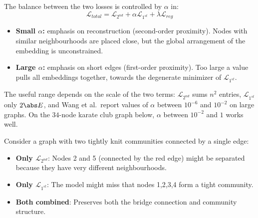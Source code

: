 \begin{notechapter}
The balance between the two losses is controlled by $\alpha$ in:
\[
\mathcal{L}_{total} = \mathcal{L}_{2^{nd}} + \alpha \mathcal{L}_{1^{st}} + \lambda \mathcal{L}_{reg}
\]

\begin{itemize}
    \item \textbf{Small $\alpha$:} emphasis on reconstruction (second-order proximity). Nodes with similar neighbourhoods are placed close, but the global arrangement of the embedding is unconstrained.
    \item \textbf{Large $\alpha$:} emphasis on short edges (first-order proximity). Too large a value pulls all embeddings together, towards the degenerate minimizer of $\mathcal L_{1^{st}}$.
\end{itemize}
The useful range depends on the scale of the two terms: $\mathcal L_{2^{nd}}$ sums $n^2$ entries, $\mathcal L_{1^{st}}$ only $2\abs E$, and Wang et al.\ report values of $\alpha$ between $10^{-6}$ and $10^{-2}$ on large graphs. On the $34$-node karate club graph below, $\alpha$ between $10^{-2}$ and $1$ works well.

\begin{example}
Consider a graph with two tightly knit communities connected by a single edge:

\begin{center}
\end{center}

\begin{itemize}
    \item \textbf{Only $\mathcal{L}_{2^{nd}}$}: Nodes 2 and 5 (connected by the red edge) might be separated because they have very different neighbourhoods.
    \item \textbf{Only $\mathcal{L}_{1^{st}}$}: The model might miss that nodes 1,2,3,4 form a tight community.
    \item \textbf{Both combined}: Preserves both the bridge connection and community structure.
\end{itemize}
\end{example}


\end{notechapter}
